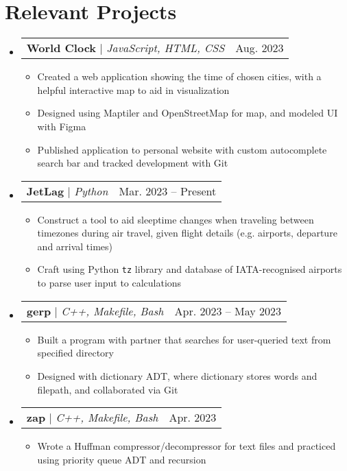 \documentclass[letterpaper,11pt]{article}
\makeatletter
\newcommand{\resumeItem}[1]{
  \item\small{
    {#1 \vspace{-2pt}}
  }
}
\newcommand{\resumeProjectHeading}[2]{
    \item
    \begin{tabular*}{0.97\textwidth}{l@{\extracolsep{\fill}}r}
      \small#1 & #2 \\
    \end{tabular*}\vspace{-7pt}
}
\newcommand{\resumeSubHeadingListStart}{\begin{itemize}[leftmargin=0in, label={}]}
\newcommand{\resumeSubHeadingListEnd}{\end{itemize}}
\newcommand{\resumeItemListStart}{\begin{itemize}}
\newcommand{\resumeItemListEnd}{\end{itemize}\vspace{-5pt}}
\makeatother
\begin{document}
\section{Relevant Projects}
    \resumeSubHeadingListStart
    \resumeProjectHeading
        {\textbf{World Clock} $|$ \emph{JavaScript, HTML, CSS}}{Aug. 2023}
        \resumeItemListStart
          \resumeItem{Created a web application showing the time of chosen cities, with a helpful interactive map to aid in visualization}
          \resumeItem{Designed using Maptiler and OpenStreetMap for map, and modeled UI with Figma}
          \resumeItem{Published application to personal website with custom autocomplete search bar and tracked development with Git}
          \resumeItemListEnd
    \resumeProjectHeading
          {\textbf{JetLag} $|$ \emph{Python}}{Mar. 2023 – Present}
          \resumeItemListStart
            \resumeItem{Construct a tool to aid sleeptime changes when traveling between timezones during air travel,
            given flight details (e.g. airports, departure and arrival
            times)}
            \resumeItem{Craft using Python \texttt{tz} library and database of IATA-recognised airports to parse user input to calculations}
          \resumeItemListEnd
      \resumeProjectHeading
          {\textbf{gerp} $|$ \emph{C++, Makefile, Bash}}{Apr. 2023 – May 2023}
          \resumeItemListStart
            \resumeItem{Built a program with partner that searches for user-queried text from specified directory}
            \resumeItem{Designed with dictionary ADT, where dictionary stores words and filepath, and collaborated via Git}
          \resumeItemListEnd
          \resumeProjectHeading
          {\textbf{zap} $|$ \emph{C++, Makefile, Bash}}{Apr. 2023}
          \resumeItemListStart
          \resumeItem{Wrote a Huffman compressor/decompressor for text files and practiced using priority queue ADT and recursion}
          \resumeItemListEnd
    \resumeSubHeadingListEnd
\end{document}

